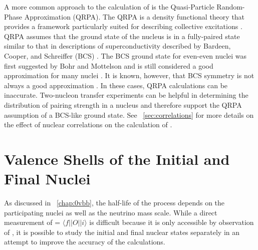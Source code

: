 A more common approach to the calculation of \NME is the Quasi-Particle Random-Phase Approximation (QRPA).  The QRPA is a density functional theory that provides a framework particularly suited for describing collective excitations \citep{Casten}.  QRPA assumes that the ground state of the nucleus is in a fully-paired state \citep{BenderSCMF} similar to that in descriptions of superconductivity described by Bardeen, Cooper, and Schreiffer (BCS) \citep{BCS}.  The BCS ground state for even-even nuclei was first suggested by Bohr and Mottelson \citep{nucleiBCS} and is still considered a good approximation for many nuclei \citep{validRegionsBCS_highMass}.  It is known, however, that BCS symmetry is not always a good approximation \citep{NambuBCS}.  In these cases, QRPA calculations can be inaccurate.  Two-nucleon transfer experiments can be helpful in determining the distribution of pairing strength in a nucleus \citep{Yoshida} and therefore support the QRPA assumption of a BCS-like ground state.  See {\sect}~\ref{sec:correlations} for more details on the effect of nuclear correlations on the calculation of \NME. 

\section{Valence Shells of the Initial and Final Nuclei}
\label{sec:valence}

As discussed in {\chap}~\ref{chap:0vbb}, the half-life of the \zvbb process depends on the participating nuclei as well as the neutrino mass scale.  While a direct measurement of \NME = $\langle f||O||i \rangle$ is difficult because it is only accessible by observation of \zvbb, it is possible to study the initial and final nuclear states separately in an attempt to improve the accuracy of the calculations.  

